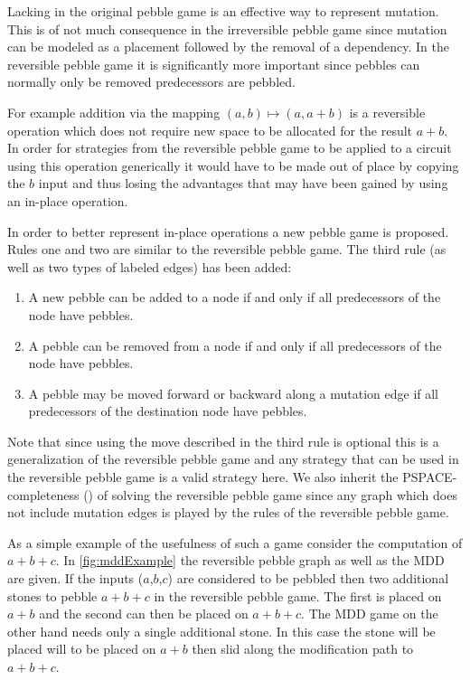 Lacking in the original pebble game is an effective way to represent mutation.
This is of not much consequence in the irreversible pebble game since mutation
can be modeled as a placement followed by the removal of a dependency. In the
reversible pebble game it is significantly more important since pebbles can
normally only be removed predecessors are pebbled.

For example addition via the mapping $(a,b) \mapsto (a,a+b)$ is a reversible
operation which does not require new space to be allocated for the result $a+b$.
In order for strategies from the reversible pebble game to be applied to a
circuit using this operation generically it would have to be made out of place
by copying the $b$ input and thus losing the advantages that may have been
gained by using an in-place operation.

In order to better represent in-place operations a new pebble game is proposed.
Rules one and two are similar to the reversible pebble game. The third rule
(as well as two types of labeled edges) has been added:

\begin{enumerate}

   \item A new pebble can be added to a node if and only if all predecessors of
     the node have pebbles.

   \item A pebble can be removed from a node if and only if all predecessors of
     the node have pebbles.

   \item A pebble may be moved forward or backward along a mutation edge if all
     predecessors of the destination node have pebbles.

\end{enumerate}

Note that since using the move described in the third rule is optional this is a
generalization of the reversible pebble game and any strategy that can be used
in the reversible pebble game is a valid strategy here. We also inherit the
PSPACE-completeness (\cite{chan13}) of solving the reversible pebble game since
any graph which does not include mutation edges is played by the rules of the
reversible pebble game.

As a simple example of the usefulness of such a game consider the computation of
$a+b+c$. In \cref{fig:mddExample} the reversible pebble graph as well as the MDD
are given. If the inputs ($a$,$b$,$c$) are considered to be pebbled then two
additional stones to pebble $a+b+c$ in the reversible pebble game. The first is
placed on $a+b$ and the second can then be placed on $a+b+c$. The MDD game on
the other hand needs only a single additional stone. In this case the stone will
be placed will to be placed on $a+b$ then slid along the modification path to
$a+b+c$.

